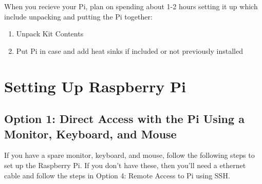 \documentclass{article}\usepackage[]{graphicx}\usepackage[]{color}
\begin{document}
When you recieve your Pi, plan on spending about 1-2 hours setting it up which include unpacking and putting the Pi together: 

\begin{enumerate}

\item Unpack Kit Contents
\item Put Pi in case and add heat sinks if included or not previously installed

\end{enumerate}

\section{Setting Up Raspberry Pi}

\subsection{Option 1: Direct Access with the Pi Using a Monitor, Keyboard, and Mouse}

If you have a spare monitor, keyboard, and mouse, follow the following steps to set up the Raspberry Pi. If you don't have these, then you'll need a ethernet cable and follow the steps in Option 4: Remote Access to Pi using SSH. 
\end{document}

